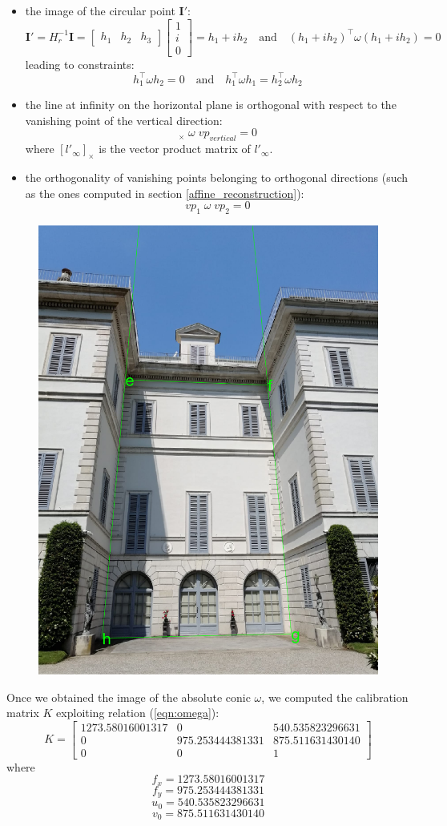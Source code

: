 \documentclass[11pt, oneside]{article}
\begin{document}
\begin{itemize}
	\item the image of the circular point $\textbf{I}'$:
	\begin{equation}
		\textbf{I}' = H_r^{-1} \textbf{I} =
		\begin{bmatrix}
			h_1 & h_2 & h_3
		\end{bmatrix}
		\begin{bmatrix}
			1 \\ i \\ 0
		\end{bmatrix}
		= h_1 + ih_2
		\quad \text{and} \quad (h_1 + ih_2)^\intercal \omega (h_1 + ih_2) = 0	
	\end{equation}
	leading to constraints:
	$$h_1^\intercal \omega h_2 = 0 \quad \text{and} \quad h_1^\intercal \omega h_1 = h_2^\intercal \omega h_2$$
	\item the line at infinity on the horizontal plane is orthogonal with respect to the vanishing point of the vertical direction:
	\begin{equation}
		[l'_{\infty}]_\times\; \omega\; vp_{vertical} = 0
	\end{equation}
	where $[l'_{\infty}]_\times$ is the vector product matrix of $l'_{\infty}$.
	\item the orthogonality of vanishing points belonging to orthogonal directions (such as the ones computed in section \ref{affine_reconstruction}):
	$$vp_1\; \omega\; vp_2 = 0$$
\end{itemize}
\begin{figure}[!h]
	\centering
	\includegraphics[width=0.30\linewidth]{image_original_vertical_vp.png}
	\label{image_original_vertical_vp}
\end{figure}
Once we obtained the image of the absolute conic $\omega$, we computed the calibration matrix $K$ exploiting relation (\ref{eqn:omega}):
\begin{equation}
	K =
	\begin{bmatrix}
		1273.58016001317 & 0 & 540.535823296631 \\
		0 & 975.253444381331 & 875.511631430140 \\
		0 & 0 & 1
	\end{bmatrix}
\end{equation}
where
$$f_x = 1273.58016001317$$
$$f_y = 975.253444381331$$
$$u_0 = 540.535823296631$$
$$v_0 = 875.511631430140$$
\end{document}
